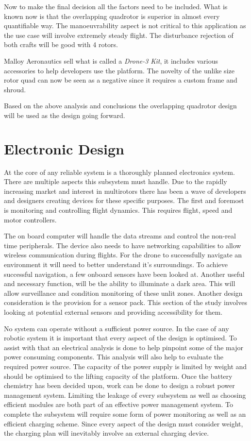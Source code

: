 			Now to make the final decision all the factors need to be included. What is known now is that the overlapping quadrotor is superior in almost every quantifiable way. The manoeuvrability aspect is not critical to this application as the use case will involve extremely steady flight. The disturbance rejection of both crafts will be good with 4 rotors. 
			
			Malloy Aeronautics sell what is called a \textit{Drone-3 Kit}, it includes various accessories to help developers use the platform. The novelty of the unlike size rotor quad can now be seen as a negative since it requires a custom frame and shroud.
			
			Based on the above analysis and conclusions the overlapping quadrotor design will be used as the design going forward.

	\section{Electronic Design}
	At the core of any reliable system is a thoroughly planned electronics system. There are multiple aspects this subsystem must handle. Due to the rapidly increasing market and interest in multirotors there has been a wave of developers and designers creating devices for these specific purposes. The first and foremost is monitoring and controlling flight dynamics. This requires flight, speed and motor controllers.	
	
	The on board computer will handle the data streams and control the non-real time peripherals. The device also needs to have networking capabilities to allow wireless communication during flights. For the drone to successfully navigate an environment it will need to better understand it's surroundings. To achieve successful navigation, a few onboard sensors have been looked at. Another useful and necessary function, will be the ability to illuminate a dark area. This will allow surveillance and condition monitoring of these unlit zones. Another design consideration is the provision for a sensor pack. This section of the study involves looking at potential external sensors and providing accessibility for them.
	
	No system can operate without a sufficient power source. In the case of any robotic system it is important that every aspect of the design is optimised. To assist with that an electrical analysis is done to help pinpoint some of the major power consuming components. This analysis will also help to evaluate the required power source. The capacity of the power supply is limited by weight and should be optimised to the lifting capacity of the platform. Once the battery chemistry has been decided upon, work can be done to design a robust power management system. Limiting the leakage of every subsystem as well as choosing efficient modules are both part of an effective power management system. To complete the subsystem will require some form of power monitoring as well as an efficient charging scheme. Since every aspect of the design must consider weight, the charging plan will inevitably involve an external charging device.
	
